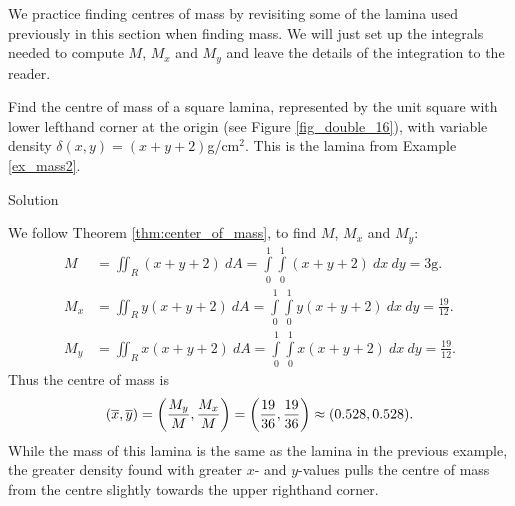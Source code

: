 We  practice  finding centres of mass by revisiting some of the lamina used previously in this section when finding mass. We will  just set up the integrals needed to compute $M$, $M_x$ and $M_y$ and leave the details of the integration to the reader.

\begin{example}
Find the centre of mass of a square lamina, represented by the unit square with lower lefthand corner at the origin (see Figure \ref{fig_double_16}), with variable density $\delta(x,y) = (x+y+2)$g/cm$^2$. This is the lamina from Example \ref{ex_mass2}.

Solution 

We follow Theorem \ref{thm:center_of_mass}, to find $M$, $M_x$ and $M_y$:
\begin{align*}
M &= \iint_R (x+y+2)\ dA = \int\limits_0^1\int\limits_0^1 (x+y+2)\ dx\ dy =3\text{g}.\\
M_x &= \iint_R y(x+y+2)\ dA = \int\limits_0^1\int\limits_0^1 y(x+y+2)\ dx\ dy =\frac{19}{12}.\\
M_y &= \iint_R x(x+y+2)\ dA = \int\limits_0^1\int\limits_0^1 x(x+y+2)\ dx\ dy =\frac{19}{12}.
\end{align*}
Thus the centre of mass is $$\displaystyle (\overline{x},\overline{y}) = \left(\frac{M_y}M,\frac{M_x}M\right) = \left(\frac{19}{36},\frac{19}{36}\right) \approx (0.528,0.528).$$ While the mass of this lamina is the same as the lamina in the previous example, the greater density found with greater $x$- and $y$-values pulls the centre of mass from the centre slightly towards the upper righthand corner.
\end{example}

